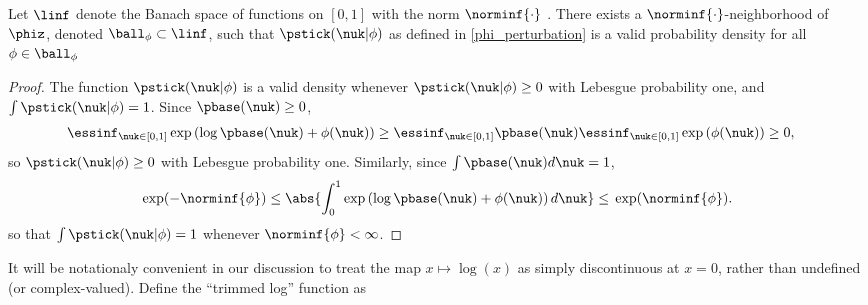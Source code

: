 \begin{prop}
%
Let $\linf$ denote the Banach space of functions on $[0,1]$ with the norm
$\norminf{\cdot}$ \citep[Theorem 5.2.1]{dudley:2018:real}.
There exists a $\norminf{\cdot}$-neighborhood of $\phiz$, denoted $\ball_\phi
\subset \linf$, such that $\pstick(\nuk \vert \phi)$ as defined in
\eqref{phi_perturbation} is a valid probability density for all $\phi \in
\ball_\phi$
%
\begin{proof}
%
The function $\pstick(\nuk \vert \phi)$ is a valid density whenever
$\pstick(\nuk \vert \phi) \ge 0$ with Lebesgue probability one, and $\int
\pstick(\nuk \vert \phi) = 1$. Since $\pbase(\nuk) \ge 0$,
%
\begin{align*}
%
\essinf_{\nuk \in [0,1]} \exp\left(\log \pbase(\nuk) + \phi(\nuk)\right)
    \ge{}&
\essinf_{\nuk \in [0,1]} \pbase(\nuk)
\essinf_{\nuk \in [0,1]} \exp\left(\phi(\nuk)\right)
\ge{}0,
%
\end{align*}
%
so $\pstick(\nuk \vert \phi) \ge 0$ with Lebesgue probability one. Similarly,
since $\int \pbase(\nuk) d\nuk = 1$,
%
\begin{align*}
%
\exp(-\norminf{\phi}) \le{}
\abs{\int_0^1 \exp\left(\log \pbase(\nuk) + \phi(\nuk)\right) d\nuk}
\le{}
\exp(\norminf{\phi}).
%
\end{align*}
%
so that $\int \pstick(\nuk \vert \phi) = 1$ whenever $\norminf{\phi} < \infty$.
%
\end{proof}
%
\end{prop}












It will be notationaly convenient in our discussion to treat the map $x \mapsto
\log(x)$ as simply discontinuous at $x = 0$, rather than undefined (or
complex-valued). Define the ``trimmed log'' function as

